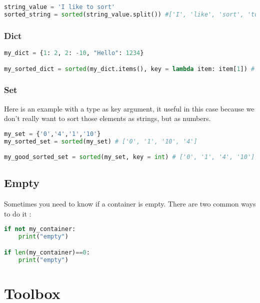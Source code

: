 \documentclass[a4paper, 12pt, titlepage]{scrartcl} %
\begin{document}
\begin{lstlisting}[language=Python]
string_value = 'I like to sort'
sorted_string = sorted(string_value.split()) #['I', 'like', 'sort', 'to'] #split() allows to not consider white spaces
\end{lstlisting} \vspace{5mm}

\subsubsection{Dict}
\begin{lstlisting}[language=Python]
my_dict = {1: 2, 2: -10, "Hello": 1234}

my_sorted_dict = sorted(my_dict.items(), key = lambda item: item[1]) # [(2,-10),(1,2),("hello",1234)]
\end{lstlisting} \vspace{5mm}

\subsubsection{Set}
Here is an example with a type as key argument, it useful in this case because we don't really want to sort those elements as strings, but as numbers.

\begin{lstlisting}[language=Python]
my_set = {'0','4','1','10'}
my_sorted_set = sorted(my_set) # ['0', '1', '10', '4']

my_good_sorted_set = sorted(my_set, key = int) # ['0', '1', '4', '10']
\end{lstlisting} \vspace{5mm}

\subsection{Empty}
Sometimes you need to know if a container is empty. There are two common ways to do it :
\begin{lstlisting}[language=Python]
if not my_container:
    print("empty")

if len(my_container)==0:
    print("empty")
\end{lstlisting} \vspace{5mm}

\newpage
\section{Toolbox}
\end{document}
